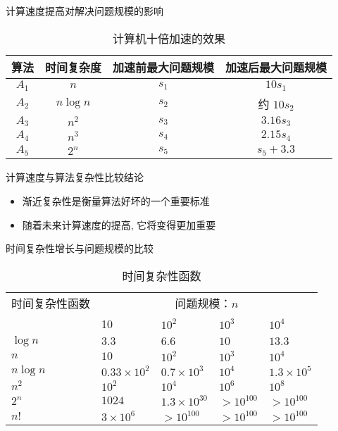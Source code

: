 \documentclass[fontset=fandol,UTF8,12pt,aspectratio=169,fleqn]{beamer}
\begin{document}
\begin{frame}{计算速度提高对解决问题规模的影响}
\begin{table}
\centering
\small{
\caption{计算机十倍加速的效果}
\begin{tabular}[c]{|c|c|c|c|}
\hline
算法 & 时间复杂度 & 加速前最大问题规模 & 加速后最大问题规模 \\
\hline
$A_1$ & $n$ & $s_1$ & $10s_1$ \\

$A_2$ & $n\log n$ & $s_2$ & 约 $10s_2$ \\

$A_3$ & $n^2$ & $s_3$ & $3.16s_3$ \\

$A_4$ & $n^3$ & $s_4$ & $2.15s_4$ \\

$A_5$ & $2^n$ & $s_5$ & $s_5+3.3$ \\
\hline
\end{tabular}
}
\end{table}
\end{frame}

\begin{frame}{计算速度与算法复杂性比较结论}
\begin{itemize}[<+-|alert@+>]
\item 渐近复杂性是衡量算法好坏的一个重要标准  
\item 随着未来计算速度的提高, 它将变得更加重要  
\end{itemize}
\end{frame}

\begin{frame}{时间复杂性增长与问题规模的比较}
\begin{table}
\centering
\small{
\caption{时间复杂性函数}
\begin{tabular}[l]{|l|l|l|l|l|}
\hline
时间复杂性函数 & \multicolumn{4}{c|}{问题规模：$n$} \\
\cline{2-5} & 10 & $10^2$ & $10^3$ & $10^4$ \\
\hline
$\log n$ & $3.3$ & $6.6$ & $10$ & $13.3$ \\
$n$  & $10$ & $10^2$ & $10^3$ & $10^4$ \\
$n\log n$ & $0.33\times 10^2$ & $0.7\times 10^3$ & $10^4$ & $1.3\times 10^5$ \\
$n^2$ &  $10^2$ & $10^4$ & $10^6$ & $10^8$ \\
$2^n$  & $1024$ & $1.3 \times 10^{30}$ & $>10^{100}$ & $> 10^{100}$ \\
$n!$ & $3\times 10^6$ & $>10^{100}$ & $>10^{100}$ & $> 10^{100}$ \\
\hline
\end{tabular}
}
\end{table}
\end{frame}
\end{document}
